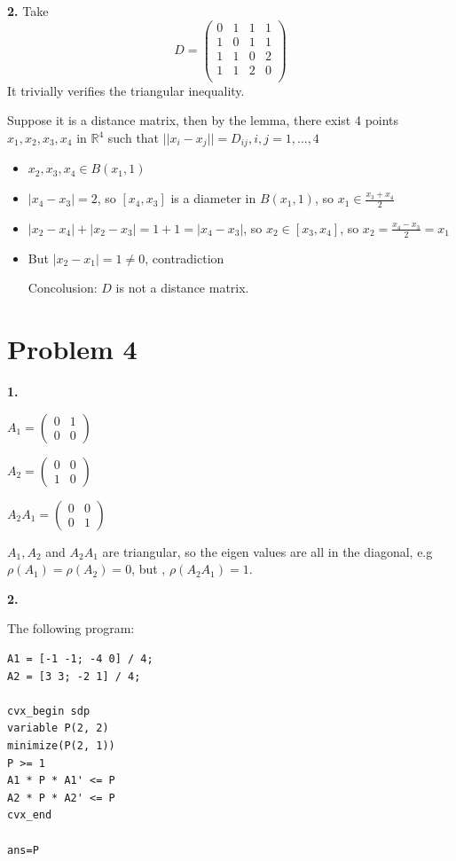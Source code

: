 \documentclass[11pt]{article}
\begin{document}
\textbf{2.}
Take
$$D = \begin{pmatrix}
   0 & 1 & 1 & 1\\
   1 & 0 & 1 & 1\\
   1 & 1 & 0 & 2\\
   1 & 1 & 2 & 0\\
  \end{pmatrix}
  $$
It trivially verifies the triangular inequality.

Suppose it is a distance matrix, then by the lemma, there exist 4 points \(x_1, x_2, x_3, x_4\) in \(\mathbb R^4\)
such that \(||x_i - x_j|| = D_{ij}, i,j=1,\ldots,4\)

\begin{itemize}
\item \(x_2, x_3, x_4 \in B(x_1, 1)\)
\item \(|x_4-x_3| = 2\), so \([x_4, x_3]\) is a diameter in \(B(x_1, 1)\), so \(x_1 \in \frac{x_3 + x_4}2\)
\item \(|x_2 - x_4| + |x_2 - x_3| = 1 + 1 = |x_4 - x_3|\), so \(x_2 \in [x_3, x_4]\), so \(x_2 = \frac{x_4 - x_3}2 = x_1\)
\item But \(|x_2 - x_1| = 1 \ne 0\), contradiction

Concolusion: \(D\) is not a distance matrix.
\end{itemize}

\section{Problem 4}
\label{sec:orgheadline5}


\textbf{1.}

\(A_1 = \begin{pmatrix} 0 & 1 \\ 0 & 0 \end{pmatrix}\)

\(A_2 = \begin{pmatrix} 0 & 0 \\ 1 & 0 \end{pmatrix}\)

\(A_2 A_1 = \begin{pmatrix}0& 0\\0&1\end{pmatrix}\)


\(A_1, A_2\) and \(A_2A_1\) are triangular, so the eigen values are all in the diagonal,  e.g \(\rho(A_1) = \rho(A_2) = 0\), but , \(\rho(A_2A_1) = 1\).

\textbf{2.}

The following program:
\begin{verbatim}
A1 = [-1 -1; -4 0] / 4;
A2 = [3 3; -2 1] / 4;

cvx_begin sdp
variable P(2, 2)
minimize(P(2, 1))
P >= 1
A1 * P * A1' <= P
A2 * P * A2' <= P
cvx_end

ans=P
\end{verbatim}
\end{document}
